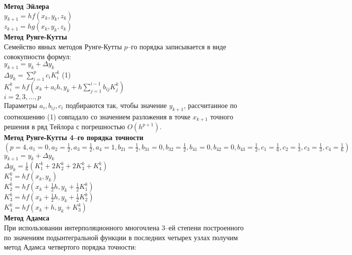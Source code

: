 \textbf{Метод Эйлера}\\

$y_{k+1}=hf(x_k, y_k, z_k)$\\
$z_{k+1}=hg(x_k, y_k, z_k)$\\

\textbf{Метод Рунге-Кутты}\\

Семейство явных методов Рунге-Кутты $p$--го порядка записывается в виде совокупности формул:\\

$y_{k+1}=y_k+\Delta y_k$\\
$\Delta y_k=\sum\limits_{i=1}^pc_iK_i^k$ \qquad (1)\\
$K_i^k=hf(x_k+a_ih, y_k+h\sum\limits_{j=1}^{i-1}b_{ij}K_j^k)$\\
$i=2,3,...,p$\\

Параметры $a_i, b_{ij}, c_i$ подбираются так, чтобы значение $y_{k+1}$, рассчитанное по соотношению (1) совпадало со значением разложения в точке $x_{k+1}$ точного решения в ряд Тейлора с погрешностью $O(h^{p+1})$.\\

\textbf{Метод Рунге-Кутты 4--го порядка точности}\\

$(p=4, a_1=0, a_2=\frac{1}{2}, a_3=\frac{1}{2}, a_4=1, b_{21}=\frac{1}{2}, b_{31}=0, b_{32}=\frac{1}{2}, b_{41}=0, b_{42}=0, b_{43}=\frac{1}{2}, c_1=\frac{1}{6}, c_2=\frac{1}{3}, c_3=\frac{1}{3}, c_4=\frac{1}{6})$\\

$y_{k+1}=y_k+\Delta y_k$\\

$\Delta y_k=\frac{1}{6}(K_1^k+2K_2^k+2K_3^k+K_4^k)$\\

$K_1^k=hf(x_k, y_k)$\\

$K_2^k=hf(x_k+\frac{1}{2}h, y_k+\frac{1}{2}K_1^k)$\\

$K_3^k=hf(x_k+\frac{1}{2}h, y_k+\frac{1}{2}K_2^k)$\\

$K_4^k=hf(x_k+h, y_k+K_3^k)$\\

\textbf{Метод Адамса}\\

При использовании интерполяционного многочлена 3--ей степени построенного по значениям подынтегральной функции в последних четырех узлах получим метод Адамса четвертого порядка точности:\\

